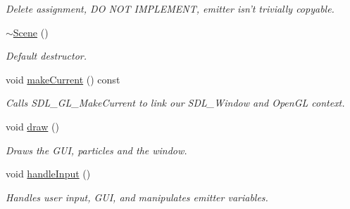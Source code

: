 \begin{DoxyCompactItemize}
\begin{DoxyCompactList}\small\item\em Delete assignment, D\-O N\-O\-T I\-M\-P\-L\-E\-M\-E\-N\-T, emitter isn't trivially copyable. \end{DoxyCompactList}\item 
\hypertarget{classScene_a3b8cec2e32546713915f8c6303c951f1}{\hyperlink{classScene_a3b8cec2e32546713915f8c6303c951f1}{$\sim$\-Scene} ()}\label{classScene_a3b8cec2e32546713915f8c6303c951f1}

\begin{DoxyCompactList}\small\item\em Default destructor. \end{DoxyCompactList}\item 
\hypertarget{classScene_ab404b2cf95322ad5efd4f3f5d942bdaf}{void \hyperlink{classScene_ab404b2cf95322ad5efd4f3f5d942bdaf}{make\-Current} () const }\label{classScene_ab404b2cf95322ad5efd4f3f5d942bdaf}

\begin{DoxyCompactList}\small\item\em Calls S\-D\-L\-\_\-\-G\-L\-\_\-\-Make\-Current to link our S\-D\-L\-\_\-\-Window and Open\-G\-L context. \end{DoxyCompactList}\item 
\hypertarget{classScene_ac0e3d2c98ba6063a086467fb2c19142f}{void \hyperlink{classScene_ac0e3d2c98ba6063a086467fb2c19142f}{draw} ()}\label{classScene_ac0e3d2c98ba6063a086467fb2c19142f}

\begin{DoxyCompactList}\small\item\em Draws the G\-U\-I, particles and the window. \end{DoxyCompactList}\item 
\hypertarget{classScene_a839b81cdf0cdc807e48e660d92606496}{void \hyperlink{classScene_a839b81cdf0cdc807e48e660d92606496}{handle\-Input} ()}\label{classScene_a839b81cdf0cdc807e48e660d92606496}

\begin{DoxyCompactList}\small\item\em Handles user input, G\-U\-I, and manipulates emitter variables. \end{DoxyCompactList}\end{DoxyCompactItemize}
